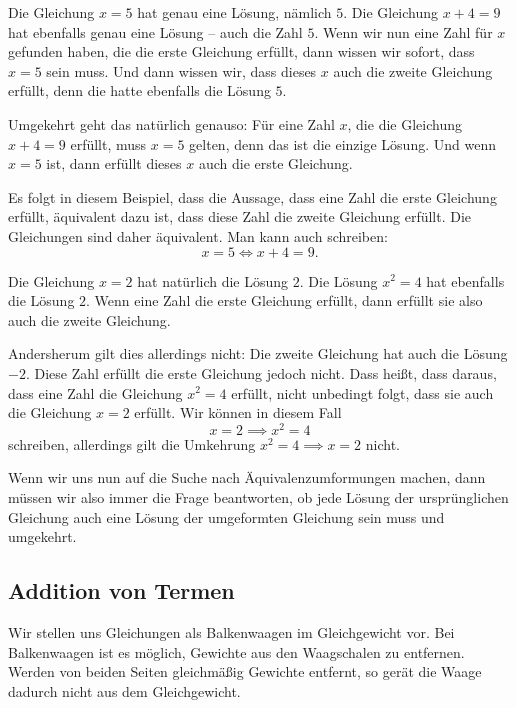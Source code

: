 \documentclass[../../main.tex]{subfiles}
\begin{document}
\begin{example}{}
    Die Gleichung $x=5$ hat genau eine Lösung, nämlich $5$. Die Gleichung $x+4=9$ hat ebenfalls genau eine Lösung -- auch die Zahl $5$. Wenn wir nun eine Zahl für $x$ gefunden haben, die die erste Gleichung erfüllt, dann wissen wir sofort, dass $x=5$ sein muss. Und dann wissen wir, dass dieses $x$ auch die zweite Gleichung erfüllt, denn die hatte ebenfalls die Lösung $5$.
    
    Umgekehrt geht das natürlich genauso: Für eine Zahl $x$, die die Gleichung $x+4=9$ erfüllt, muss $x=5$ gelten, denn das ist die einzige Lösung. Und wenn $x=5$ ist, dann erfüllt dieses $x$ auch die erste Gleichung.
    
    Es folgt in diesem Beispiel, dass die Aussage, dass eine Zahl die erste Gleichung erfüllt, äquivalent dazu ist, dass diese Zahl die zweite Gleichung erfüllt. Die Gleichungen sind daher äquivalent. Man kann auch schreiben:
    \[x=5\iff x+4=9.\]
\end{example}
\begin{example}{}
    Die Gleichung $x=2$ hat natürlich die Lösung $2$. Die Lösung $x^2=4$ hat ebenfalls die Lösung $2$. Wenn eine Zahl die erste Gleichung erfüllt, dann erfüllt sie also auch die zweite Gleichung.
    
    Andersherum gilt dies allerdings nicht: Die zweite Gleichung hat auch die Lösung $-2$. Diese Zahl erfüllt die erste Gleichung jedoch nicht. Dass heißt, dass daraus, dass eine Zahl die Gleichung $x^2=4$ erfüllt, nicht unbedingt folgt, dass sie auch die Gleichung $x=2$ erfüllt. Wir können in diesem Fall
    \[x=2\implies x^2=4\]
    schreiben, allerdings gilt die Umkehrung $x^2=4 \implies x=2$ nicht.
\end{example}
Wenn wir uns nun auf die Suche nach Äquivalenzumformungen machen, dann müssen wir also immer die Frage beantworten, ob jede Lösung der ursprünglichen Gleichung auch eine Lösung der umgeformten Gleichung sein muss und umgekehrt.

\subsection{Addition von Termen}

Wir stellen uns Gleichungen als Balkenwaagen im Gleichgewicht vor. Bei Balkenwaagen ist es möglich, Gewichte aus den Waagschalen zu entfernen. Werden von beiden Seiten gleichmäßig Gewichte entfernt, so gerät die Waage dadurch nicht aus dem Gleichgewicht.
\end{document}
